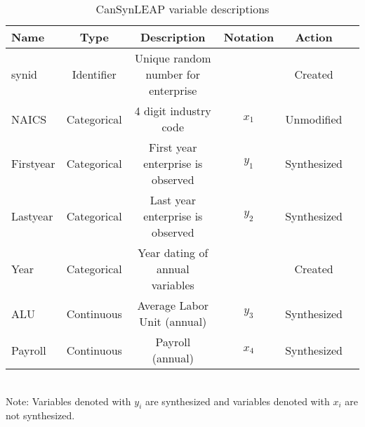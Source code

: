 \begin{table}[H]
  \centering\footnotesize
  \caption{CanSynLEAP variable descriptions}  \label{tab:LEAP_Variable} \medskip
  \renewcommand{\arraystretch}{1}
  \begin{tabular}{l  c c c c c}
    \toprule
    \textbf{Name}&\textbf{Type}&\textbf{Description}&\textbf{Notation}&\textbf{Action}\\
    \midrule
synid&Identifier&Unique random number for enterprise&&Created\\
NAICS&Categorical&4 digit industry code&$x_{1}$&Unmodified\\
Firstyear&Categorical&First year enterprise is observed &$y_{1}$&Synthesized\\
Lastyear&Categorical&Last year enterprise is observed &$y_{2}$&Synthesized\\
Year&Categorical&Year dating of annual variables&&Created\\
ALU&Continuous&Average Labor Unit (annual)&$y_{3}$&Synthesized\\
Payroll&Continuous&Payroll (annual)&$x_{4}$&Synthesized\\
   \bottomrule
  \end{tabular} 
\\
Note: Variables denoted with $y_{i}$ are synthesized and variables denoted with $x_{i}$ are not synthesized. 
\end{table}